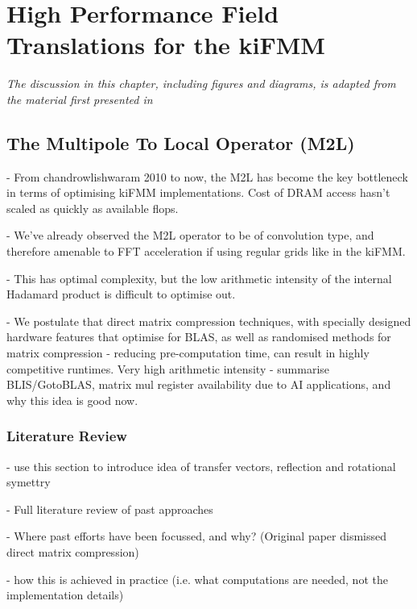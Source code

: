 \chapter{High Performance Field Translations for the kiFMM}\label{chpt:field_translation}
\thispagestyle{chaptertitle} %

\begin{center}
    \textit{The discussion in this chapter, including figures and diagrams, is adapted from the material first presented in \cite{kailasa2024m2ltranslationoperatorskernel} }
\end{center}

\section{The Multipole To Local Operator (M2L)}

- From chandrowlishwaram 2010 to now, the M2L has become the key bottleneck in terms of optimising kiFMM implementations. Cost of DRAM access hasn't scaled as quickly as available flops.

- We've already observed the M2L operator to be of convolution type, and therefore amenable to FFT acceleration if using regular grids like in the kiFMM.

- This has optimal complexity, but the low arithmetic intensity of the internal Hadamard product is difficult to optimise out.

- We postulate that direct matrix compression techniques, with specially designed hardware features that optimise for BLAS, as well as randomised methods for matrix compression - reducing pre-computation time, can result in highly competitive runtimes. Very high arithmetic intensity
- summarise BLIS/GotoBLAS, matrix mul register availability due to AI applications, and why this idea is good now.


\subsection{Literature Review}

- use this section to introduce idea of transfer vectors, reflection and rotational symettry

- Full literature review of past approaches

- Where past efforts have been focussed, and why? (Original paper dismissed direct matrix compression)

- how this is achieved in practice (i.e. what computations are needed, not the implementation details)



